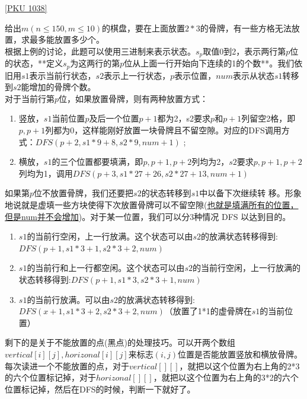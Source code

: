 \underline {[PKU 1038]}

给出$m(n\leq 150,m\leq 10)$的棋盘，要在上面放置$2*3$的骨牌，有一些方格无法放置，求最多能放置多少个。\\

根据上例的讨论，此题可以使用三进制来表示状态。$s_p$取值0到2，表示两行第$p$位的状态，**定义$s_p$为这两行的第$p$位从上面一行开始向下连续的1的个数**。我们依旧用$s1$表示当前行状态，$s2$表示上一行状态，$p$表示位置，$num$表示从状态$s1$转移到$s2$能增加的骨牌个数。\\
对于当前行第$p$位，如果放置骨牌，则有两种放置方式：
\begin{enumerate}
\item 竖放，$s1$当前位置$p$及后一个位置$p+1$都为2，s2要求$p$和$p+1$列留空2格，即$p,p+1$列都为0，这样能刚好放置一块骨牌且不留空隙。对应的DFS调用方式：$DFS(p + 2, s1 * 9 + 8, s2 * 9, num + 1)$ ;
\item 横放，$s1$的三个位置都要填满，即$p,p+1,p+2$列均为2，$s2$要求$p,p+1,p+2$列均为1，调用$DFS(p + 3, s1 * 27 + 26, s2 * 27 + 13, num + 1)$
\end{enumerate}
如果第$p$位不放置骨牌，我们还要把$s2$的状态转移到$s1$中以备下次继续转
移。形象地说就是虚填一些方块使得下次放置骨牌可以不留空隙(\underline {也就是填满所有的位置，但是num并不会增加})。对于某一位置，我们可以分3种情况 DFS 以达到目的。
\begin{enumerate}
\item $s1$的当前行空闲，上一行放满。这个状态可以由$s2$的放满状态转移得到:$DFS(p + 1,s1 * 3 + 1, s2 * 3 + 2, num)$
\item $s1$的当前行和上一行都空闲。这个状态可以由$s2$的当前行空闲，上一行放满的状态转移得到:$DFS(p + 1, s1 * 3, s2 * 3 + 1, num)$
\item $s1$的当前行放满。可以由$s2$的放满状态转移得到:$DFS(x + 1, s1 * 3 + 2, s2 * 3 + 2, num)$（放置了1*1的虚骨牌在$s1$的当前位置）
\end{enumerate}
剩下的是关于不能放置的点(黑点)的处理技巧。可以开两个数组$vertical[i][j],horizonal[i][j]$来标志$(i,j)$位置是否能放置竖放和横放骨牌。每次读进一个不能放置的点，对于$vertical[][]$，就把以这个位置为右上角的2*3的六个位置标记掉，对于$horizonal[][]$，就把以这个位置为右上角的3*2的六个位置标记掉，然后在DFS的时候，判断一下就好了。
